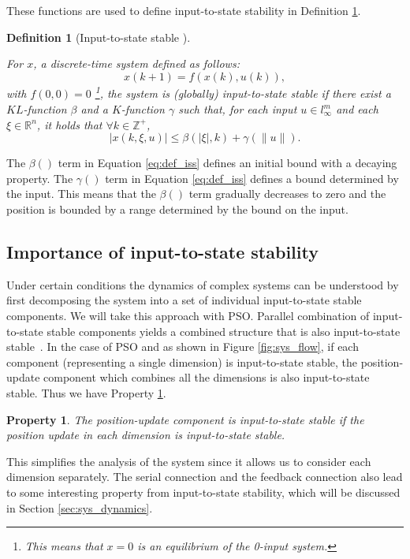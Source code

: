 \documentclass{sig-alternate}
\newtheorem{mydef}{Definition}
\newtheorem{myprop}{Property}
\begin{document}
These functions are used to define input-to-state stability in Definition \ref{def:iss}.

\begin{mydef}[Input-to-state stable \cite{Jiang2001857}]
\label{def:iss}

For $ x $, a discrete-time system defined as follows:
\begin{equation}
\label{eq:dis_nonlinear}
x(k+1) = f( x(k) , u(k) ),
\end{equation}
with $ f(0,0) = 0 $
\footnote{This means that $ x = 0 $ is an equilibrium of the 0-input system.}, the system is \emph{(globally) input-to-state stable} if there exist a $ KL $-function $ \beta  $ and a $ K $-function $ \gamma $ such that, for each input $ u \in l^{m}_{\infty} $ and each $ \xi \in \mathbb{R}^{n} $, it holds that $  \forall k \in \mathbb{Z}^{+} $,
\begin{equation}
\label{eq:def_iss}
| x(k, \xi, u) | \leq \beta (| \xi |, k) + \gamma (\lVert u \rVert).
\end{equation}
\end{mydef}

The $ \beta () $ term in Equation \eqref{eq:def_iss} defines an initial bound with a decaying property.
The $ \gamma () $ term in Equation \eqref{eq:def_iss} defines a bound determined by the input.
This means that the $ \beta () $ term gradually decreases to zero and the position is bounded by a range determined by the bound on the input.

\subsection{Importance of input-to-state stability}
\label{sec:connect_iss_to_pso}

Under certain conditions the dynamics of complex systems can be understood by first decomposing the system into a set of individual input-to-state stable components. 
We will take this approach with PSO. 
Parallel combination of input-to-state stable components yields a combined structure that is also input-to-state stable~\cite{khalil1996nonlinear}.
In the case of PSO and as shown in Figure \ref{fig:sys_flow}, if each component (representing a single dimension) is input-to-state stable, the position-update component which combines all the dimensions is also input-to-state stable.
Thus we have Property \ref{prop:iss:parallel}.
\begin{myprop}
\label{prop:iss:parallel}
The position-update component is input-to-state stable if the position update in each dimension is input-to-state stable.
\end{myprop}
This simplifies the analysis of the system since it allows us to consider each dimension separately.
The serial connection and the feedback connection also lead to some interesting property from input-to-state stability, which will be discussed in Section \ref{sec:sys_dynamics}.
\end{document}
